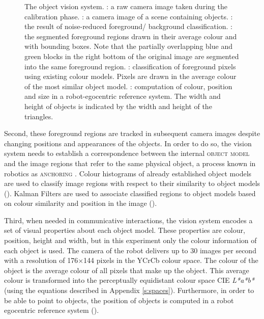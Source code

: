 \begin{figure}[htbp]
{    \label{f:perception-e}
  }
  \caption[The object vision system]{The object vision
    system. : a raw camera image taken during
    the calibration phase. : a camera image of
    a scene containing objects. : the result of
    noise-reduced foreground/ background
    classification. : the segmented foreground
    regions drawn in their average colour and with bounding
    boxes. Note that the partially overlapping blue and green blocks
    in the right bottom of the original image are segmented into the
    same foreground region. : classification of
    foreground pixels using existing colour models. Pixels are drawn
    in the average colour of the most similar object
    model. : computation of colour, position
    and size in a robot-egocentric reference system. The width and
    height of objects is indicated by the width and height of the
    triangles.}
  \label{f:object-perception}
\end{figure}

Second, these foreground regions are tracked in subsequent camera
images despite changing positions and appearances of the objects. In
order to do so, the vision system needs to establish a correspondence
between the internal \textsc{object model} and the image regions that
refer to the same physical object, a process known in robotics as
\textsc{anchoring} \citep{coradeschi03anchoring}. Colour histograms of
already established object models are used to classify image regions
with respect to their similarity to object models (). Kalman Filters \citep{kalman60new} are used to
associate classified regions to object models based on colour
similarity and position in the image ().

Third, when needed in communicative interactions, the vision system
encodes a set of visual properties about each object model. These
properties are colour, position, height and width, but in this
experiment only the colour information of each object is used. The
camera of the robot delivers up to 30 images per second with a
resolution of 176$\times$144 pixels in the YCrCb colour space. The
colour of the object is the average colour of all pixels that make up
the object. This average colour is transformed into the perceptually
equidistant colour space CIE \emph{L*a*b*} (using the equations
described in Appendix \ref{s:spaces}). Furthermore, in order to be able
to point to objects, the position of objects is computed in a robot
egocentric reference system ().

